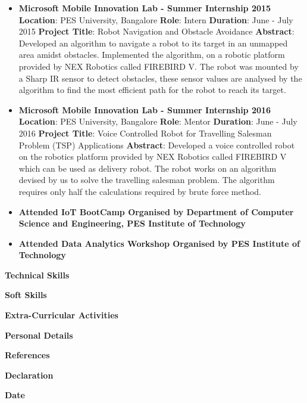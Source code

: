 \documentclass[a4paper,12pt,final]{memoir}
\newcommand{\Sep}{\vspace{1.5em}}
\newcommand{\SmallSep}{\vspace{0.5em}}
\newcommand{\CVSection}[1]
{\Large\textbf{#1}\par
	\SmallSep\normalsize\normalfont}
\begin{document}
		\begin{itemize}
			\item \textbf{Microsoft Mobile Innovation Lab - Summer Internship 2015} \newline
			{\footnotesize
				\textbf{Location}: PES University, Bangalore \newline
				\textbf{Role}: Intern \newline
				\textbf{Duration}: June - July 2015 \newline
				\textbf{Project Title}: Robot Navigation and Obstacle Avoidance \newline
				\textbf{Abstract}: Developed an algorithm to navigate a robot to its target in an unmapped area amidst obstacles. Implemented the algorithm, on a robotic platform provided by NEX Robotics called FIREBIRD V. The robot was mounted by a Sharp IR sensor to detect obstacles, these sensor values are analysed by the algorithm to find the most efficient path for the robot to reach its target.
			}
			\item \textbf{Microsoft Mobile Innovation Lab - Summer Internship 2016} \newline
			{\footnotesize
				\textbf{Location}: PES University, Bangalore \newline
				\textbf{Role}: Mentor \newline
				\textbf{Duration}: June - July 2016 \newline
				\textbf{Project Title}: Voice Controlled Robot for Travelling Salesman Problem (TSP) Applications \newline
				\textbf{Abstract}: Developed a voice controlled robot on the robotics platform provided by NEX Robotics called FIREBIRD V which can be used as delivery robot. The robot works on an algorithm devised by us to solve the travelling salesman problem. The algorithm requires only half the calculations required by brute force method.
			}
			\item \textbf{Attended IoT BootCamp Organised by Department of Computer Science and Engineering, PES Institute of Technology} 
			
			\item \textbf{Attended Data Analytics Workshop Organised by PES Institute of Technology}
		\end{itemize}
	\Sep
	
	\CVSection{Technical Skills}
	\Sep
	
	\CVSection{Soft Skills}
	\Sep
	
	\CVSection{Extra-Curricular Activities}
	\Sep
	
	\CVSection{Personal Details}
	\Sep

	\CVSection{References}
	\Sep
		
	\CVSection{Declaration}
	\Sep
	
	\CVSection{Date}
	\Sep

	
\end{document}
